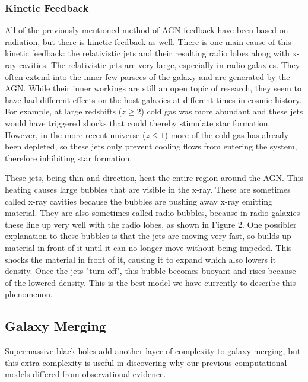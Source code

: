 \documentclass[12pt]{article}
\begin{document}
    \subsubsection{Kinetic Feedback}
    All of the previously mentioned method of AGN feedback have been based on
    radiation, but there is kinetic feedback as well.  There is one main cause
    of this kinetic feedback: the relativistic jets and their resulting
    radio lobes along
    with x-ray cavities.  The relativistic jets are very large,
    especially in radio galaxies.  They often extend into the inner few parsecs
    of the galaxy and are generated by the AGN.  While their inner workings are
    still an open topic of research, they seem to have had different effects on
    the host galaxies at different times in cosmic history.  For example, at
    large redshifts ($z \ge 2$) cold gas was more abundant and these jets would
    have triggered shocks that could thereby stimulate star formation.  However,
    in the more recent universe ($z \le 1$) more of the cold gas has already
    been depleted, so these jets only prevent cooling flows from entering the
    system, therefore inhibiting star formation.

    These jets, being thin and direction, heat the entire region around the AGN.
    This heating causes large bubbles that are visible in the x-ray.  These are
    sometimes called x-ray cavities because the bubbles are pushing away x-ray
    emitting material.  They are also sometimes called radio bubbles, because in
    radio galaxies these line up very well with the radio lobes, as shown in
    Figure 2.  One possibler explanation to these bubbles is that the jets are
    moving very fast, so builds up material in front of it until it can no
    longer move without being impeded.  This shocks the material in front of
    it, causing it to expand which also lowers it density.  Once the jets "turn
    off", this bubble becomes buoyant and rises because of the lowered density.
    This is the best model we have currently to describe this phenomenon.


\subsection {Galaxy Merging}
Supermassive black holes add another layer of complexity to galaxy merging, but
this extra complexity is useful in discovering why our previous computational
models differed from observational evidence.
\end{document}
